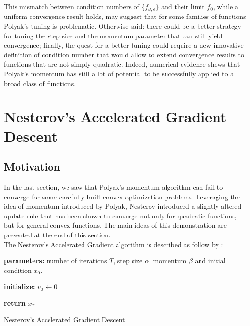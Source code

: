 \documentclass{article}
\begin{document}
This mismatch between condition numbers of $\{f_{\omega,\epsilon}\}$ and their limit $f_0$, while a uniform convergence result holds, may suggest that for some families of functions Polyak's tuning is problematic. Otherwise said: there could be a better strategy for tuning the step size and the momentum parameter that can still yield convergence; finally, the quest for a better tuning could require a new innovative definition of condition number that would allow to extend convergence results to functions that are not simply quadratic. 
Indeed, numerical evidence shows that Polyak's momentum has still a lot of potential to be successfully applied to a broad class of functions.


%
%


\section{Nesterov's Accelerated Gradient Descent}

\subsection{Motivation}

In the last section, we saw that Polyak's momentum algorithm can fail to converge for some carefully built convex optimization problems. Leveraging the idea of momentum introduced by Polyak, Nesterov introduced a slightly altered update rule that has been shown to converge not only for quadratic functions, but for general convex functions. 
The main ideas of this demonstration are presented at the end of this section.\\

The Nesterov's Accelerated Gradient algorithm is described as follow by \citet{Sutskever2013}:
\begin{algorithm}[H]
\SetAlgoLined
\textbf{parameters:} number of iterations $T$, step size $\alpha$, momentum $\beta$ and initial condition $x_0$.

\textbf{initialize:} $v_0 \gets 0$

 
 \textbf{return } $x_{T}$
 \caption{Nesterov's Accelerated Gradient Descent \label{NAGD}}
\end{algorithm}
\end{document}
